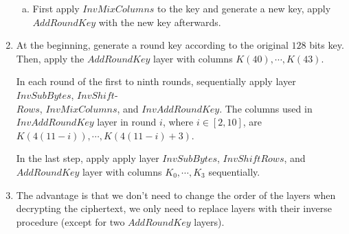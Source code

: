 \documentclass[11pt,a4paper]{article}
\begin{document}
\begin{enumerate}
\begin{enumerate}[(a)]
		\item First apply $\mathit{InvMixColumns}$ to the key and generate a new key, apply $\mathit{AddRoundKey}$ with the new key afterwards.
		
	\end{enumerate}
	
	\item At the beginning, generate a round key according to the original $128$ bits key. Then, apply the $\mathit{AddRoundKey}$ layer with columns $K(40),\cdots,K(43)$.
	\par In each round of the first to ninth rounds, sequentially apply layer $\mathit{InvSubBytes}$, $\mathit{InvShift}$-\\$\mathit{Rows}$, $\mathit{InvMixColumns}$, and $\mathit{InvAddRoundKey}$. The columns used in $\mathit{InvAddRoundKey}$ layer in round $i$, where $i\in [2,10]$, are $K(4(11-i)),\cdots,K(4(11-i)+3)$.
	\par In the last step, apply apply layer $\mathit{InvSubBytes}$, $\mathit{InvShiftRows}$, and $\mathit{AddRoundKey}$ layer with columns $K_{0},\cdots,K_{3}$ sequentially.
	
	\item The advantage is that we don't need to change the order of the layers when decrypting the ciphertext, we only need to replace layers with their inverse procedure (except for two $\mathit{AddRoundKey}$ layers). 
\end{enumerate}

\newpage
\end{document}
